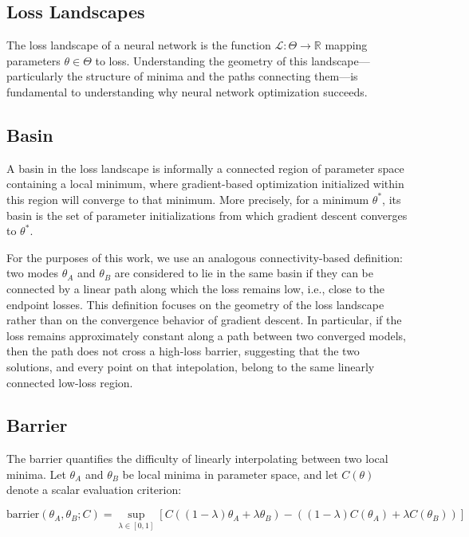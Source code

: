 \documentclass[11pt,a4paper]{report}
\begin{document}
\subsection{Loss Landscapes}

The loss landscape of a neural network is the function $\mathcal{L}: \Theta \to \mathbb{R}$ mapping parameters $\theta \in \Theta$ to loss. Understanding the geometry of this landscape---particularly the structure of minima and the paths connecting them---is fundamental to understanding why neural network optimization succeeds.

\subsection{Basin}

A basin in the loss landscape is informally a connected region of parameter space containing a local minimum, where gradient-based optimization initialized within this region will converge to that minimum. More precisely, for a minimum $\theta^*$, its basin is the set of parameter initializations from which gradient descent converges to $\theta^*$.

For the purposes of this work, we use an analogous connectivity-based definition: two modes $\theta_A$ and $\theta_B$ are considered to lie in the same basin if they can be connected by a linear path along which the loss remains low, i.e., close to the endpoint losses. This definition focuses on the geometry of the loss landscape rather than on the convergence behavior of gradient descent. In particular, if the loss remains approximately constant along a path between two converged models, then the path does not cross a high-loss barrier, suggesting that the two solutions, and every point on that intepolation, belong to the same linearly connected low-loss region.


\subsection{Barrier}

The barrier \citep{entezari2021role} quantifies the difficulty of linearly interpolating between two local minima. Let $\theta_A$ and $\theta_B$ be local minima in parameter space, and let $C(\theta)$ denote a scalar evaluation criterion:

\begin{equation}
\label{eq:barrier}
\text{barrier}(\theta_A, \theta_B; C) =
\sup_{\lambda \in [0,1]}
\left[
C\!\left((1-\lambda)\theta_A + \lambda \theta_B\right)
-
\left((1-\lambda)C(\theta_A) + \lambda C(\theta_B)\right)
\right]
\end{equation}
\end{document}
